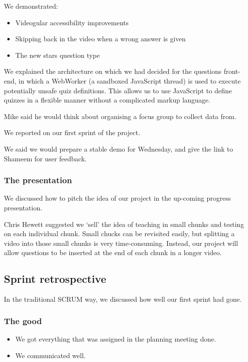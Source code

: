 We demonstrated:

\begin{itemize}
\itemsep1pt\parskip0pt
\item
  Videogular accessibility improvements
\item
  Skipping back in the video when a wrong answer is given
\item
  The new stars question type
\end{itemize}

We explained the architecture on which we had decided for the questions
front-end, in which a WebWorker (a sandboxed JavaScript thread) is used
to execute potentially unsafe quiz definitions. This allows us to use
JavaScript to define quizzes in a flexible manner without a complicated
markup language.

Mike said he would think about organising a focus group to collect data
from.

We reported on our first sprint of the project.

We said we would prepare a stable demo for Wednesday, and give the link
to Shameem for user feedback.

\subsubsection{The presentation}

We discussed how to pitch the idea of our project in the up-coming
progress presentation.

Chris Hewett suggested we `sell' the idea of teaching in small chunks
and testing on each individual chunk. Small chucks can be revisited
easily, but splitting a video into those small chunks is very
time-consuming. Instead, our project will allow questions to be inserted
at the end of each chunk in a longer video.

\subsection{Sprint retrospective}

In the traditional SCRUM way, we discussed how well our first sprint had
gone.

\subsubsection{The good}

\begin{itemize}
\itemsep1pt\parskip0pt
\item
  We got everything that was assigned in the planning meeting done.
\item
  We communicated well.
\end{itemize}

